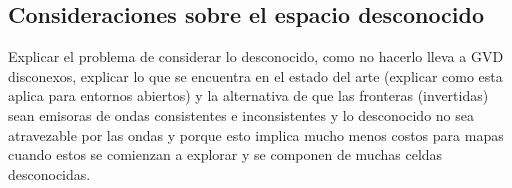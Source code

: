 





\subsection{Consideraciones sobre el espacio desconocido}
Explicar el problema de considerar lo desconocido, como no hacerlo lleva a GVD
disconexos, explicar lo que se encuentra en el estado del arte (explicar como
esta aplica para entornos abiertos) y la alternativa de que las fronteras
(invertidas) sean emisoras de ondas consistentes e inconsistentes y lo
desconocido no sea atravezable por las ondas y porque esto implica mucho menos
costos para mapas cuando estos se comienzan a explorar y se componen de muchas
celdas desconocidas.

